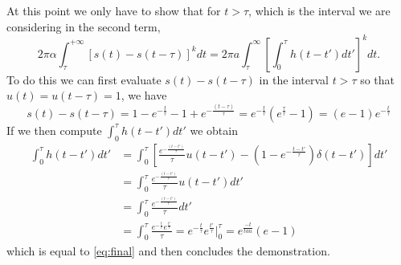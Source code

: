 At this point we only have to show that for $t>\tau$, which is the interval we are considering in the second term, 
\begin{equation}
    2\pi\alpha \int_{\tau}^{+\infty} \left[ s(t) - s(t-\tau) \right]^k dt = 2\pi a \int_{\tau}^{\infty} \left[ \int_{0}^{\tau} h(t - t') dt' \right]^k dt.
\end{equation}
%
To do this we can first evaluate $s(t)-s(t-\tau)$ in the interval $t>\tau$ so that $u(t)=u(t-\tau)=1$, we have
\begin{equation}\label{eq:final}
    s(t) - s(t-\tau) = 1- e^{-\frac{t}{\tau}} - 1 + e^{-\frac{(t-\tau)}{\tau}} = e^{-\frac{t}{\tau}} \left(e^{\frac{\tau}{\tau}}-1\right) = (e-1)e^{-\frac{t}{\tau}}
\end{equation}
%
If we then compute $\int_{0}^{\tau} h(t - t')dt'$ we obtain
\begin{align}
    \int_{0}^{\tau} h(t-t')dt' &= \int_{0}^{\tau} \left[ \frac{e^{-\frac{(t-t')}{\tau}}}{\tau} u(t-t') - \left(1-e^{-\frac{t-t'}{\tau}}\right)\delta(t-t') \right] dt'\\
    &= \int_{0}^{\tau} \frac{e^{-\frac{(t-t')}{\tau}}}{\tau} u(t-t')dt' \\
    &= \int_{0}^{\tau} \frac{e^{-\frac{(t-t')}{\tau}}}{\tau} dt'\\
    &= \int_{0}^{\tau} \frac{e^{-\frac{t}{\tau}}e^{\frac{t'}{\tau}}}{\tau} = e^{-\frac{t}{\tau}}e^{\frac{t'}{\tau}}\Big|_{0}^{\tau} = e^{\frac{-t}{tau}}(e-1)
\end{align}
which is equal to \ref{eq:final} and then concludes the demonstration.

